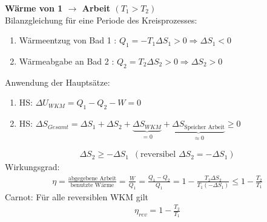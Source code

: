 \textbf{Wärme von 1 $\rightarrow$ Arbeit $(T_1>T_2)$}\\
Bilanzgleichung für eine Periode des
Kreisprozesses:
\begin{enumerate}
    \item Wärmeentzug von Bad 1 : $Q_1 = -T_1\Delta S_1>0 \Rightarrow \Delta S_1<0$
    \item Wärmeabgabe an Bad 2 : $Q_2 = T_2 \Delta S_2 > 0 \Rightarrow \Delta S_2 > 0$
\end{enumerate}
Anwendung der Hauptsätze:
\begin{enumerate}
    \item HS: $\Delta U_{WKM}=Q_1-Q_2-W=0$
    \item HS: $\Delta S_{Gesamt}= \Delta S_1 + \Delta S_2 + \underbrace{\Delta S_{WKM}}_{=0} + \underbrace{\Delta S_{\text{Speicher Arbeit}}}_{\approx 0}\geq 0$
\end{enumerate}
\begin{align}
    \Delta S_2 \geq -\Delta S_1 \enspace (\text{reversibel }\Delta S_2 = -\Delta S_1)
\end{align}
Wirkungsgrad:
\begin{align}
    \eta = \frac{\text{abgegebene Arbeit}}{\text{benutzte Wärme}}=\frac{W}{Q_1}=\frac{Q_1-Q_2}{Q_1}=1-\frac{T_2\Delta S_2}{T_1(-\Delta S_1)}\leq 1-\frac{T_2}{T_1}
\end{align}
Carnot: Für alle reversiblen WKM gilt
\begin{align}
    \eta_{rev}= 1-\frac{T_2}{T_1}
\end{align}

